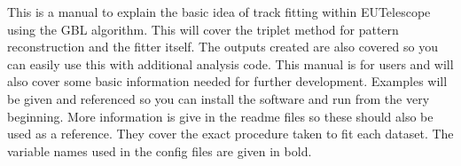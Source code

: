 This is a manual to explain the basic idea of track fitting within EUTelescope using the GBL algorithm. 
This will cover the triplet method for pattern reconstruction and the fitter itself. The outputs created are also covered so you can easily use this with additional analysis code. This manual is for users and will also cover some basic information needed for further development. Examples will be given and referenced so you can install the software and run from the very beginning. More information is give in the readme files so these should also be used as a reference. They cover the exact procedure taken to fit each dataset. The variable names used in the config files are given in bold.




